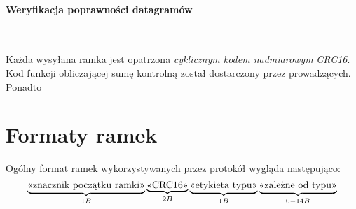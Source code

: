 \documentclass[a4paper,12pt]{article}
\begin{document}
\paragraph{Weryfikacja poprawności datagramów}\

Każda wysyłana ramka jest opatrzona \emph{cyklicznym kodem nadmiarowym}
\emph{CRC16}. Kod funkcji obliczającej sumę kontrolną został dostarczony
przez prowadzących. Ponadto 

\section{Formaty ramek}

Ogólny format ramek wykorzystywanych przez protokół wygląda następująco:
\begin{displaymath}
  \underbrace{\hbox{<<znacznik początku ramki>>}}_{1B}
  \underbrace{\hbox{<<CRC16>>}}_{2B}
  \underbrace{\hbox{<<etykieta typu>>}}_{1B}
  \underbrace{\hbox{<<zależne od typu>>}}_{0-14B}
\end{displaymath}
\end{document}
